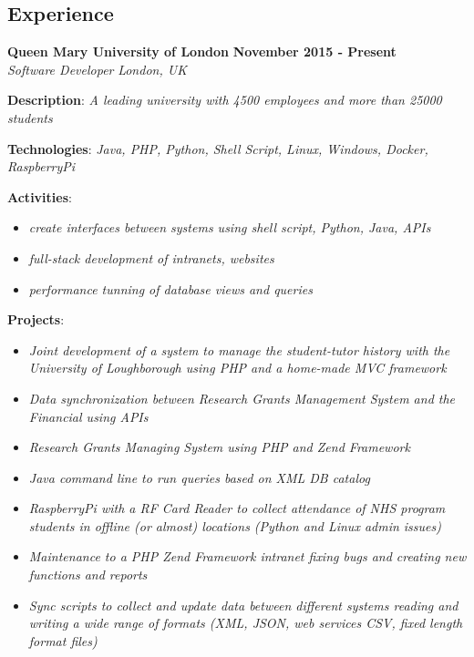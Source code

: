 \documentclass[margin]{res}
\begin{document}
\begin{resume}
\section{Experience}
  \textbf{Queen Mary University of London} \hfill \textbf{November 2015 - Present}\\
  \textit{Software Developer} \hfill \textit{London, UK}\\
  \begin{description}
    \item{\textbf{Description}: \textit{A leading university with 4500 employees and more than 25000 students}}
    \item{\textbf{Technologies}: \textit{Java, PHP, Python, Shell Script, Linux, Windows, Docker, RaspberryPi}}
    \item{
      \textbf{Activities}:
      \begin{itemize}
              \item{\textit{create interfaces between systems using shell script, Python, Java, APIs}}
              \item{\textit{full-stack development of intranets, websites}}
              \item{\textit{performance tunning of database views and queries}}
            \end{itemize}
    }
        \item{
      \textbf{Projects}:
      \begin{itemize}
              \item{\textit{Joint development of a system to manage the student-tutor history with the University of Loughborough using PHP and a home-made MVC framework}}
              \item{\textit{Data synchronization between Research Grants Management System and the Financial using APIs}}
              \item{\textit{Research Grants Managing System using PHP and Zend Framework}}
              \item{\textit{Java command line to run queries based on XML DB catalog}}
              \item{\textit{RaspberryPi with a RF Card Reader to collect attendance of NHS program students in offline (or almost) locations (Python and Linux       admin issues)}}
              \item{\textit{Maintenance to a PHP Zend Framework intranet fixing bugs and creating new functions and reports}}
              \item{\textit{Sync scripts to collect and update data between different systems reading and writing a wide range of formats (XML, JSON, web services      CSV, fixed length format files)}}

\end{itemize}}
\end{description}
\end{resume}
\end{document}
